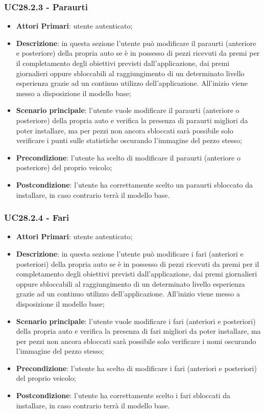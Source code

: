 \subsubsection{UC28.2.3 - Paraurti}
\begin{itemize}
	\item \textbf{Attori Primari}: utente autenticato;
	\item \textbf{Descrizione}: in questa sezione l'utente può modificare il paraurti (anteriore e posteriore) della propria auto se è in possesso di pezzi ricevuti da premi per il completamento degli obiettivi previsti dall'applicazione, dai premi giornalieri oppure sbloccabili al raggiungimento di un determinato livello esperienza grazie ad un continuo utilizzo dell'applicazione.
	All'inizio viene messo a disposizione il modello base;
	\item \textbf{Scenario principale}: l'utente vuole modificare il paraurti (anteriore o posteriore) della propria auto e verifica la presenza di paraurti migliori da poter installare, ma per pezzi non ancora sbloccati sarà possibile solo verificare i punti sulle statistiche oscurando l'immagine del pezzo stesso;
	\item \textbf{Precondizione}: l'utente ha scelto di modificare il paraurti (anteriore o posteriore) del proprio veicolo; 
	\item \textbf{Postcondizione}: l'utente ha correttamente scelto un paraurti sbloccato da installare, in caso contrario terrà il modello base.
\end{itemize}
\subsubsection{UC28.2.4 - Fari}
\begin{itemize}
	\item \textbf{Attori Primari}: utente autenticato;
	\item \textbf{Descrizione}: in questa sezione l'utente può modificare i fari (anteriori e posteriori) della propria auto se è in possesso di pezzi ricevuti da premi per il completamento degli obiettivi previsti dall'applicazione, dai premi giornalieri oppure sbloccabili al raggiungimento di un determinato livello esperienza grazie ad un continuo utilizzo dell'applicazione. All'inizio viene messo a disposizione il modello base;
	\item \textbf{Scenario principale}: l'utente vuole modificare i fari (anteriori e posteriori) della propria auto e verifica la presenza di fari migliori da poter installare, ma per pezzi non ancora sbloccati sarà possibile solo verificare i nomi oscurando l'immagine del pezzo stesso;
	\item \textbf{Precondizione}: l'utente ha scelto di modificare i fari (anteriori e posteriori) del proprio veicolo; 
	\item \textbf{Postcondizione}: l'utente ha correttamente scelto i fari sbloccati da installare, in caso contrario terrà il modello base.
\end{itemize}
